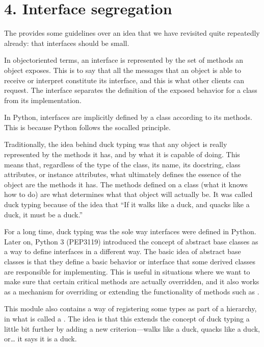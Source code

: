 \documentclass[a4paper,10pt,english]{sphinxmanual}
\begin{document}
\section{4. Interface segregation}
\label{\detokenize{chapters/4_solid_principles/index:interface-segregation}}
The  provides some guidelines over an idea that we
have revisited quite repeatedly already: that interfaces should be small.

In object\sphinxhyphen{}oriented terms, an interface is represented by the set of methods an object
exposes. This is to say that all the messages that an object is able to receive or interpret
constitute its interface, and this is what other clients can request. The interface separates the
definition of the exposed behavior for a class from its implementation.

In Python, interfaces are implicitly defined by a class according to its methods. This is
because Python follows the so\sphinxhyphen{}called  principle.

Traditionally, the idea behind duck typing was that any object is really represented by the
methods it has, and by what it is capable of doing. This means that, regardless of the type of
the class, its name, its docstring, class attributes, or instance attributes, what ultimately
defines the essence of the object are the methods it has. The methods defined on a class
(what it knows how to do) are what determines what that object will actually be. It was
called duck typing because of the idea that “If it walks like a duck, and quacks like a duck,
it must be a duck.”

For a long time, duck typing was the sole way interfaces were defined in Python. Later on,
Python 3 (PEP\sphinxhyphen{}3119) introduced the concept of abstract base classes as a way to define
interfaces in a different way. The basic idea of abstract base classes is that they define a
basic behavior or interface that some derived classes are responsible for implementing. This
is useful in situations where we want to make sure that certain critical methods are actually
overridden, and it also works as a mechanism for overriding or extending the functionality
of methods such as .

This module also contains a way of registering some types as part of a hierarchy, in what is
called a . The idea is that this extends the concept of duck typing a little bit
further by adding a new criterion—walks like a duck, quacks like a duck, or… it says it is a
duck.
\end{document}
